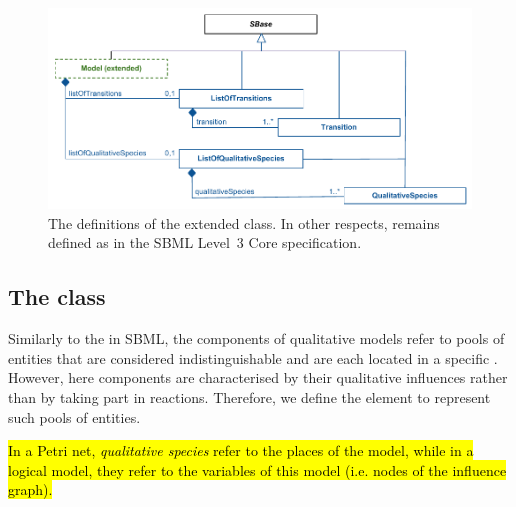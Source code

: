 \begin{figure}[h!]
  \includegraphics{figs/qual-extended-model-uml.pdf}
  \caption{The definitions of the extended \Model class. In other respects, \Model remains defined as
    in the SBML Level~3 Core specification.}
  \label{qual-extended-model-uml}
\end{figure}

\pagebreak
\subsection{The  class}
\label{qualSpecies-class}
Similarly to the  in SBML, the components of qualitative models refer to pools of entities that are considered indistinguishable and are each located in a specific . However, here components are characterised by their qualitative influences rather than by taking part in reactions. Therefore, we define the \QualitativeSpecies element to represent such pools of entities.

\hl{In a Petri net, {\em qualitative species} refer to the places of the model, while in a logical model, they refer to the variables of this model (i.e. nodes of the influence graph).}

